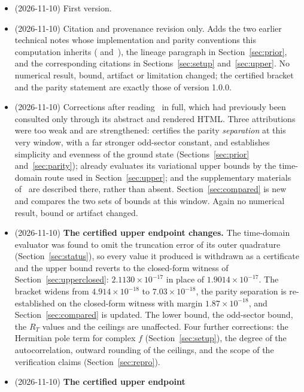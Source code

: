 \documentclass[11pt,a4paper]{article}
\theoremstyle{definition}
\theoremstyle{remark}
\begin{document}
\begin{itemize}
\item[\textbf{1.0.0}] (2026-11-10) First version.
\item[\textbf{1.0.1}] (2026-11-10) Citation and provenance revision only. Adds
  the two earlier technical notes whose implementation and parity conventions
  this computation inherits (\cite{Sensitivity} and~\cite{ParityNote}), the
  lineage paragraph in Section~\ref{sec:prior}, and the corresponding citations
  in Sections~\ref{sec:setup} and~\ref{sec:upper}. No numerical result, bound,
  artifact or limitation changed; the certified bracket and the parity
  statement are exactly those of version 1.0.0.
\item[\textbf{1.0.2}] (2026-11-10) Corrections after reading~\cite{Zhu} in full,
  which had previously been consulted only through its abstract and rendered
  HTML. Three attributions were too weak and are strengthened: \cite[Thm.~6.2]{Zhu}
  certifies the parity \emph{separation} at this very window, with a far stronger
  odd-sector constant, and establishes simplicity and evenness of the ground
  state (Sections~\ref{sec:prior} and~\ref{sec:parity});
  \cite[\S6.2]{Zhu} already evaluates its variational upper bounds by the
  time-domain route used in Section~\ref{sec:upper}; and the supplementary
  materials of~\cite[\S17]{Zhu} are described there, rather than absent.
  Section~\ref{sec:compared} is new and compares the two sets of bounds at this
  window. Again no numerical result, bound or artifact changed.
\item[\textbf{1.1.0}] (2026-11-10) \textbf{The certified upper endpoint
  changes.} The time-domain evaluator was found to omit the truncation error of
  its outer quadrature (Section~\ref{sec:status}), so every value it produced is
  withdrawn as a certificate and the upper bound reverts to the closed-form
  witness of Section~\ref{sec:upperclosed}: $2.1130\times10^{-17}$ in place of
  $1.9014\times10^{-17}$. The bracket widens from $4.914\times10^{-18}$ to
  $7.03\times10^{-18}$, the parity separation is re-established on the
  closed-form witness with margin $1.87\times10^{-18}$, and
  Section~\ref{sec:compared} is updated. The lower bound, the odd-sector bound,
  the $R_T$ values and the ceilings are unaffected. Four further corrections:
  the Hermitian pole term for complex $f$ (Section~\ref{sec:setup}), the degree
  of the autocorrelation, outward rounding of the ceilings, and the scope of the
  verification claims (Section~\ref{sec:repro}).
\item[\textbf{1.2.0}] (2026-11-10) \textbf{The certified upper endpoint
}
\end{itemize}
\end{document}
